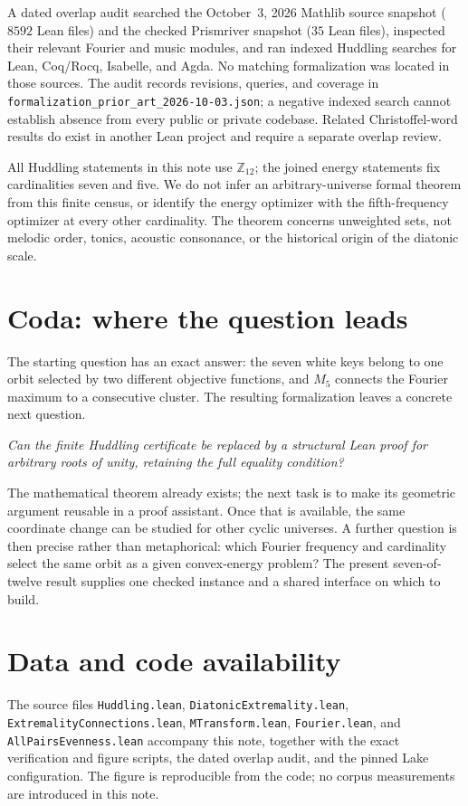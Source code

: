 \documentclass[11pt]{article}
\newcommand{\lean}[1]{\texttt{#1}}
\newcommand{\Ztwelve}{\mathbb{Z}_{12}}
\newcommand{\question}[1]{\smallskip\noindent\textit{#1}\smallskip}
\begin{document}
A dated overlap audit searched the October~3, 2026 Mathlib source snapshot
($8592$ Lean files) and the checked Prismriver snapshot ($35$ Lean files), inspected
their relevant Fourier and music modules, and ran indexed Huddling searches for
Lean, Coq/Rocq, Isabelle, and Agda. No matching formalization was located in those
sources. The audit records revisions, queries, and coverage in
\lean{formalization\_prior\_art\_2026-10-03.json}; a negative indexed search cannot
establish absence from every public or private codebase. Related Christoffel-word
results do exist in another Lean project and require a separate overlap review.

All Huddling statements in this note use $\Ztwelve$; the joined energy statements
fix cardinalities seven and five. We do not infer an arbitrary-universe formal theorem from this
finite census, or identify the energy optimizer with the fifth-frequency optimizer at
every other cardinality. The theorem concerns unweighted sets, not melodic order,
tonics, acoustic consonance, or the historical origin of the diatonic scale.

\section*{Coda: where the question leads}

The starting question has an exact answer: the seven white keys belong to one orbit
selected by two different objective functions, and $M_5$ connects the Fourier maximum
to a consecutive cluster. The resulting formalization leaves a concrete next question.

\question{Can the finite Huddling certificate be replaced by a structural Lean proof for
arbitrary roots of unity, retaining the full equality condition?}

The mathematical theorem already exists; the next task is to make its geometric argument
reusable in a proof assistant. Once that is available, the same coordinate change can be
studied for other cyclic universes. A further question is then precise rather than
metaphorical: which Fourier frequency and cardinality select the same orbit as a given
convex-energy problem? The present seven-of-twelve result supplies one checked instance
and a shared interface on which to build.

\section*{Data and code availability}
The source files \lean{Huddling.lean}, \lean{DiatonicExtremality.lean},
\lean{ExtremalityConnections.lean},
\lean{MTransform.lean}, \lean{Fourier.lean}, and \lean{AllPairsEvenness.lean} accompany
this note, together with the exact verification and figure scripts, the dated overlap
audit, and the pinned Lake configuration. The figure is reproducible from the code;
no corpus measurements are introduced in this note.
\end{document}
